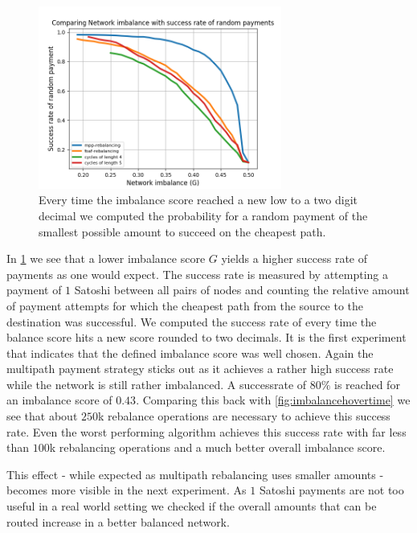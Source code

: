 \documentclass[a4paper]{paper}
\begin{document}
\begin{figure}
 \centering
 \includegraphics[width=8cm]{code/vs/fig/imba_vs_success_rates.png}
 \caption{Every time the imbalance score reached a new low to a two digit decimal we computed the probability for a random payment of the smallest possible amount to succeed on the cheapest path.}
 \label{fig:imba_vs_success}
\end{figure}

In \cref{fig:imba_vs_success} we see that a lower imbalance score $G$ yields a higher success rate of payments as one would expect.
The success rate is measured by attempting a payment of $1$ Satoshi between all pairs of nodes and counting the relative amount of payment attempts for which the cheapest path from the source to the destination was successful.
We computed the success rate of every time the balance score hits a new score rounded to two decimals.
It is the first experiment that indicates that the defined imbalance score was well chosen. 
Again the multipath payment strategy sticks out as it achieves a rather high success rate while the network is still rather imbalanced.
A successrate of $80\%$ is reached for an imbalance score of $0.43$.
Comparing this back with \cref{fig:imbalancehovertime} we see that about $250$k rebalance operations are necessary to achieve this success rate.
Even the worst performing algorithm achieves this success rate with far less than $100$k rebalancing operations and a much better overall imbalance score. 

This effect - while expected as multipath rebalancing uses smaller amounts - becomes more visible in the next experiment.
As $1$ Satoshi payments are not too useful in a real world setting we checked if the overall amounts that can be routed increase in a better balanced network.
\end{document}
